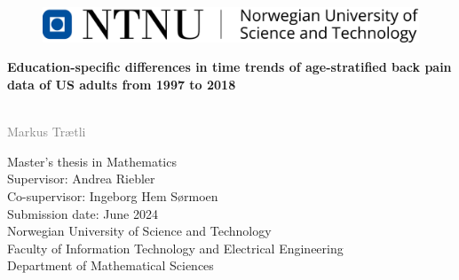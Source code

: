 \newcommand\myemptypage{
    \null
    \thispagestyle{empty}
    \addtocounter{page}{-1}
    \newpage
    } %

\begin{titlepage}
    \begin{figure}[h]
        \includegraphics[width=\textwidth]{Figures/NTNU-Bred.pdf}
    \end{figure}
    \vspace*{1.5cm}
    
    \noindent \textbf{\LARGE Education-specific differences in time trends of age-stratified back pain data of US adults from 1997 to 2018} \\

    \vspace*{-0.4cm}
     \\
    \vspace{0.5cm}

    \noindent  \textcolor{gray}{\Large Markus Trætli} \\
    \vspace{0.5cm}
    
    
    \vspace{1.5cm}%
    \noindent Master's thesis in Mathematics \\
    Supervisor: Andrea Riebler \\
    Co-supervisor: Ingeborg Hem Sørmoen \\
    Submission date: June 2024 \\
    
    \vspace{0.2cm}
    \noindent Norwegian University of Science and Technology \\
    Faculty of Information Technology and Electrical Engineering \\
    Department of Mathematical Sciences \\
\end{titlepage}
\restoregeometry
\myemptypage %

